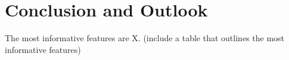 \section{Conclusion and Outlook}
\label{sec:conclusion}

The most informative features are X. (include a table that outlines the most informative features)
